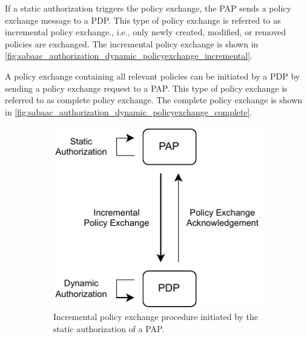 \begin{description}
    If a static authorization triggers the policy exchange, the PAP sends a policy exchange message to a PDP.
    This type of policy exchange is referred to as incremental policy exchange., i.e., only newly created, modified, or removed policies are exchanged.
    The incremental policy exchange is shown in \autoref{fig:sabaac_authorization_dynamic_policyexchange_incremental}.

    A policy exchange containing all relevant policies can be initiated by a PDP by sending a policy exchange request to a PAP.
    This type of policy exchange is referred to as complete policy exchange.
    The complete policy exchange is shown in \autoref{fig:sabaac_authorization_dynamic_policyexchange_complete}.
    \begin{figure}
        \centering
        \begin{subfigure}[t]{0.48\linewidth}
            \centering
            \includegraphics[width=\linewidth]{figures/SABAAC_protocols_authorization_dynamic_policyexchange_incremental.drawio.pdf}
            \caption{Incremental policy exchange procedure initiated by the static authorization of a PAP.}
            \label{fig:sabaac_authorization_dynamic_policyexchange_incremental}
        \end{subfigure}
        \hfill
        \begin{subfigure}[t]{0.48\linewidth}
            \centering

\end{subfigure}
\end{figure}
\end{description}

